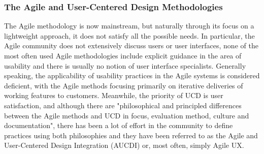 \documentclass{article}
\begin{document}
\subsubsection{The Agile and User-Centered Design Methodologies}
The Agile methodology is now mainstream, but naturally through its focus on a lightweight approach, it does not satisfy all the possible needs. In particular, the Agile community does not extensively discuss users or user interfaces, none of the most often used Agile methodologies include explicit guidance in the area of usability and there is usually no notion of user interface specialists. Generally speaking, the applicability of usability practices in the Agile systems is considered deficient, with the Agile methods focusing primarily on iterative deliveries of working features to customers. Meanwhile, the priority of UCD is user satisfaction, and although there are "philosophical and principled differences between the Agile methods and UCD in focus, evaluation method, culture and documentation", there has been a lot of effort in the community to define practices using both philosophies and they have been referred to as the Agile and User-Centered Design Integration (AUCDI) or, most often, simply Agile UX. \cite{salah2014systematic}\cite{jurca2014integrating}
\end{document}
